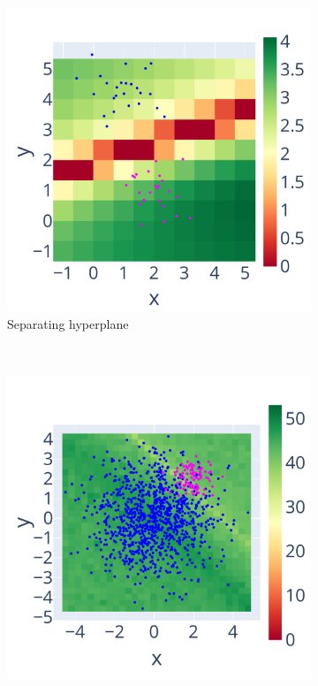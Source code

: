 \documentclass[10pt,journal,compsoc]{IEEEtran}
\begin{document}
\begin{figure}
    \centering
    \begin{subfigure}{.45\linewidth}
        \includegraphics[width=\linewidth]{figure/separating_hyperplan/hyperplane_zoom.pdf}
        \caption{Separating hyperplane}
        \label{fig:hyperplan_sig_zoom}
    \end{subfigure} \\
    \begin{subfigure}{.45\linewidth}
        \includegraphics[width=\linewidth]{figure/SVM/non_weighted.pdf}

\end{subfigure}
\end{figure}
\end{document}
